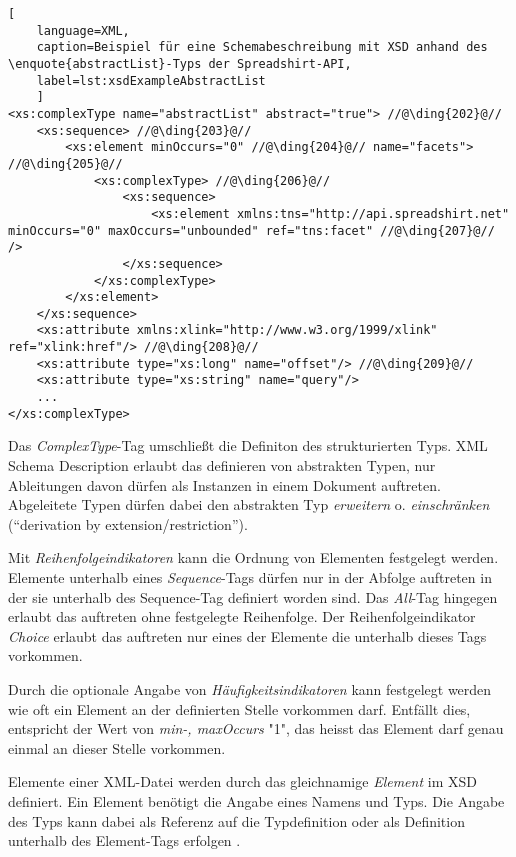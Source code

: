 \begin{lstlisting}[
    language=XML, 
    caption=Beispiel für eine Schemabeschreibung mit XSD anhand des \enquote{abstractList}-Typs der Spreadshirt-API,
    label=lst:xsdExampleAbstractList
    ]
<xs:complexType name="abstractList" abstract="true"> //@\ding{202}@//
    <xs:sequence> //@\ding{203}@//
        <xs:element minOccurs="0" //@\ding{204}@// name="facets"> //@\ding{205}@//
            <xs:complexType> //@\ding{206}@//
                <xs:sequence>
                    <xs:element xmlns:tns="http://api.spreadshirt.net" minOccurs="0" maxOccurs="unbounded" ref="tns:facet" //@\ding{207}@// />
                </xs:sequence>
            </xs:complexType>
        </xs:element>
    </xs:sequence>
    <xs:attribute xmlns:xlink="http://www.w3.org/1999/xlink" ref="xlink:href"/> //@\ding{208}@//
    <xs:attribute type="xs:long" name="offset"/> //@\ding{209}@//
    <xs:attribute type="xs:string" name="query"/>        
    ...
</xs:complexType>
\end{lstlisting}

Das \emph{ComplexType}-Tag  umschließt die Definiton des strukturierten Typs. XML Schema Description erlaubt das definieren von abstrakten Typen, nur Ableitungen davon dürfen als Instanzen in einem Dokument auftreten. Abgeleitete Typen dürfen dabei den abstrakten Typ \emph{erweitern} o. \emph{einschränken} (\enquote{derivation by extension/restriction}).

Mit \emph{Reihenfolgeindikatoren}  kann die Ordnung von Elementen festgelegt werden. Elemente unterhalb eines \emph{Sequence}-Tags dürfen nur in der Abfolge auftreten in der sie unterhalb des Sequence-Tag definiert worden sind. Das \emph{All}-Tag  hingegen erlaubt das auftreten ohne festgelegte Reihenfolge. Der Reihenfolgeindikator \emph{Choice} erlaubt das auftreten nur eines der Elemente die unterhalb dieses Tags vorkommen.

Durch die optionale Angabe von \emph{Häufigkeitsindikatoren}  kann festgelegt werden wie oft ein Element an der definierten Stelle vorkommen darf. Entfällt dies, entspricht der Wert von \emph{min-, maxOccurs} "1", das heisst das Element darf genau einmal an dieser Stelle vorkommen.

Elemente einer XML-Datei werden durch das gleichnamige \emph{Element}  im XSD definiert. Ein Element benötigt die Angabe eines Namens und Typs. Die Angabe des Typs kann dabei als Referenz auf die Typdefinition  oder als Definition unterhalb des Element-Tags erfolgen .

